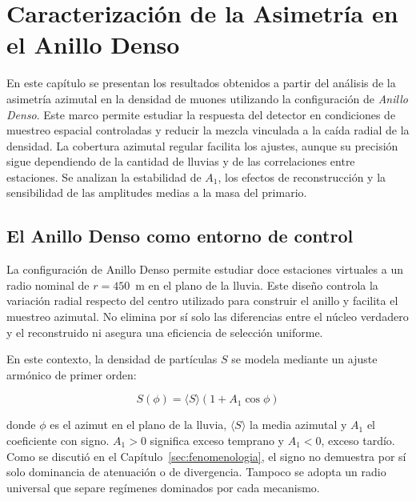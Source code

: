 
\section{Caracterización de la Asimetría en el Anillo Denso}
\label{sec:cap_anillo_denso}

En este capítulo se presentan los resultados obtenidos a partir del análisis de la asimetría azimutal en la densidad de muones utilizando la configuración de \textit{Anillo Denso}. Este marco permite estudiar la respuesta del detector en condiciones de muestreo espacial controladas y reducir la mezcla vinculada a la caída radial de la densidad. La cobertura azimutal regular facilita los ajustes, aunque su precisión sigue dependiendo de la cantidad de lluvias y de las correlaciones entre estaciones. Se analizan la estabilidad de $A_1$, los efectos de reconstrucción y la sensibilidad de las amplitudes medias a la masa del primario.

\subsection{El Anillo Denso como entorno de control}
\label{subsec:entorno_control}

La configuración de Anillo Denso permite estudiar doce estaciones virtuales a un radio nominal de $r=450$~m en el plano de la lluvia. Este diseño controla la variación radial respecto del centro utilizado para construir el anillo y facilita el muestreo azimutal. No elimina por sí solo las diferencias entre el núcleo verdadero y el reconstruido ni asegura una eficiencia de selección uniforme.

En este contexto, la densidad de partículas $S$ se modela mediante un ajuste armónico de primer orden:

\begin{equation}
	S(\phi) = \langle S \rangle (1 + A_1 \cos\phi)
	\label{eq:ajuste_armonico}
\end{equation}

donde $\phi$ es el azimut en el plano de la lluvia, $\langle S\rangle$ la media azimutal y $A_1$ el coeficiente con signo. $A_1>0$ significa exceso temprano y $A_1<0$, exceso tardío. Como se discutió en el Capítulo~\ref{sec:fenomenologia}, el signo no demuestra por sí solo dominancia de atenuación o de divergencia. Tampoco se adopta un radio universal que separe regímenes dominados por cada mecanismo.


